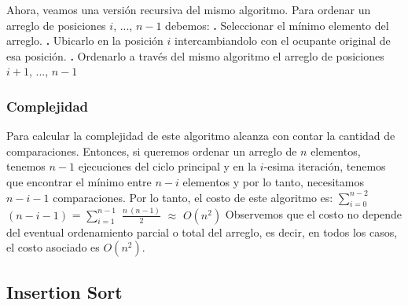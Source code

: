 \documentclass[10pt,a4paper]{article}
\begin{document}
\newline
\newline
Ahora, veamos una versión recursiva del mismo algoritmo.
\newline
\newline
Para ordenar un arreglo de posiciones $i$, ..., $n-1$ debemos:
\newline
\newline
\textbf{.} Seleccionar el mínimo elemento del arreglo.
\newline
\newline
\textbf{.} Ubicarlo en la posición $i$ intercambiandolo con el ocupante original de esa posición.
\newline
\newline
\textbf{.} Ordenarlo a través del mismo algoritmo el arreglo de posiciones $i+1$, ..., $n-1$
\newpage

\subsubsection{Complejidad}

Para calcular la complejidad de este algoritmo alcanza con contar la cantidad de comparaciones. 
\newline
\newline
Entonces, si queremos ordenar un arreglo de $n$ elementos, tenemos $n-1$ ejecuciones del ciclo principal y en la $i$-esima iteración, tenemos que encontrar el mínimo entre $n-i$ elementos y por lo tanto, necesitamos $n-i-1$ comparaciones.
\newline
\newline
Por lo tanto, el costo de este algoritmo es:
\newline
\newline
$\displaystyle \sum_{i=0}^{n-2}$ $(n-i-1)$ = $\displaystyle \sum_{i=1}^{n-1}$ $\displaystyle \frac{n~(n-1)}{2}$ $\approx$ $O(n^{2})$
\newline
\newline
\newline
Observemos que el costo no depende del eventual ordenamiento parcial o total del arreglo, es decir, en todos los casos, el costo asociado es $O(n^{2})$.

\subsection{Insertion Sort}
\end{document}
